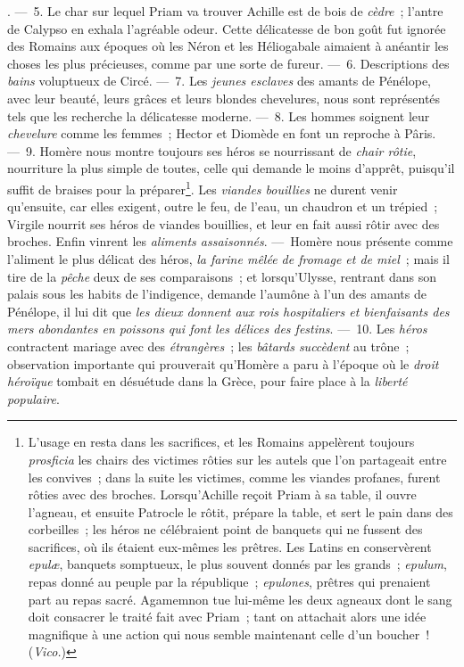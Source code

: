 \documentclass[french,twoside]{book} %
\begin{document}
{{}}. — 5. Le char sur lequel Priam va trouver Achille est de bois de {\itshape cèdre} ; l’antre de Calypso en exhala l’agréable odeur. Cette délicatesse de bon goût fut ignorée des Romains aux époques où les Néron et les Héliogabale aimaient à anéantir les choses les plus précieuses, comme par une sorte de fureur. — 6. Descriptions des {\itshape bains} voluptueux de Circé. — 7. Les {\itshape jeunes esclaves} des amants de Pénélope, avec leur beauté, leurs grâces et leurs blondes chevelures, nous sont représentés tels que les recherche la délicatesse moderne. — 8. Les hommes soignent leur {\itshape chevelure} comme les femmes ; Hector et Diomède en font un reproche à Pâris. — 9. Homère nous montre toujours ses héros se nourrissant de {\itshape chair rôtie}, nourriture la plus simple de toutes, celle qui demande le moins d’apprêt, puisqu’il suffit de braises pour la préparer\footnote{L’usage en resta dans les sacrifices, et les Romains appelèrent toujours {\itshape prosficia} les chairs des victimes rôties sur les autels que l’on partageait entre les convives ; dans la suite les victimes, comme les viandes profanes, furent rôties avec des broches. Lorsqu’Achille reçoit Priam à sa table, il ouvre l’agneau, et ensuite Patrocle le rôtit, prépare la table, et sert le pain dans des corbeilles ; les héros ne célébraient point de banquets qui ne fussent des sacrifices, où ils étaient eux-mêmes les prêtres. Les Latins en conservèrent {\itshape epulæ}, banquets somptueux, le plus souvent donnés par les grands ; {\itshape epulum}, repas donné au peuple par la république ; {\itshape epulones}, prêtres qui prenaient part au repas sacré. Agamemnon tue lui-même les deux agneaux dont le sang doit consacrer le traité fait avec Priam ; tant on attachait alors une idée magnifique à une action qui nous semble maintenant celle d’un boucher ! ({\itshape Vico.})}. Les {\itshape viandes bouillies}  ne durent venir qu’ensuite, car elles exigent, outre le feu, de l’eau, un chaudron et un trépied ; Virgile nourrit ses héros de viandes bouillies, et leur en fait aussi rôtir avec des broches. Enfin vinrent les {\itshape aliments assaisonnés}. — Homère nous présente comme l’aliment le plus délicat des héros, {\itshape la farine mêlée de fromage et de miel} ; mais il tire de la {\itshape pêche} deux de ses comparaisons ; et lorsqu’Ulysse, rentrant dans son palais sous les habits de l’indigence, demande l’aumône à l’un des amants de Pénélope, il lui dit que \emph{{\itshape les dieux donnent aux rois hospitaliers et bienfaisants des mers abondantes en poissons qui font les délices des festins}}. — 10. Les {\itshape héros} contractent mariage avec des {\itshape étrangères} ; les {\itshape bâtards succèdent} au trône ; observation importante qui prouverait qu’Homère a paru à l’époque où le {\itshape droit héroïque} tombait en désuétude dans la Grèce, pour faire place à la {\itshape liberté populaire}.\par
\end{document}
